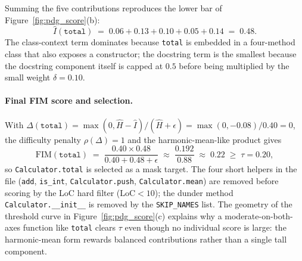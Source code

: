 Summing the five contributions reproduces the lower bar of
Figure~\ref{fig:pdg_score}(b):
%
\[
\hat{I}(\texttt{total}) \;=\; 0.06+0.13+0.10+0.05+0.14 \;=\; 0.48.
\]
%
The class-context term dominates because \texttt{total} is embedded in
a four-method class that also exposes a constructor; the docstring
term is the smallest because the docstring component itself is capped
at $0.5$ before being multiplied by the small weight $\delta=0.10$.

\paragraph{Final FIM score and selection.}
With $\Delta(\texttt{total})=\max(0,\hat{H}-\hat{I})/(\hat{H}+\epsilon)
=\max(0,-0.08)/0.40=0$, the difficulty penalty
$\rho(\Delta)=1$ and the harmonic-mean-like product gives
%
\[
\mathrm{FIM}(\texttt{total})
\;=\;\frac{0.40\!\times\!0.48}{0.40+0.48+\epsilon}
\;\approx\;\frac{0.192}{0.88}
\;\approx\;0.22
\;\geq\;\tau\!=\!0.20,
\]
%
so \texttt{Calculator.total} is selected as a mask target. The four
short helpers in the file (\texttt{add}, \texttt{is\_int},
\texttt{Calculator.push}, \texttt{Calculator.mean}) are removed before
scoring by the LoC hard filter ($\mathrm{LoC}<10$); the dunder method
\texttt{Calculator.\_\_init\_\_} is removed by the
\texttt{SKIP\_NAMES} list. The geometry of the threshold curve in
Figure~\ref{fig:pdg_score}(c) explains why a moderate-on-both-axes
function like \texttt{total} clears $\tau$ even though no individual
score is large: the harmonic-mean form rewards balanced contributions
rather than a single tall component.
